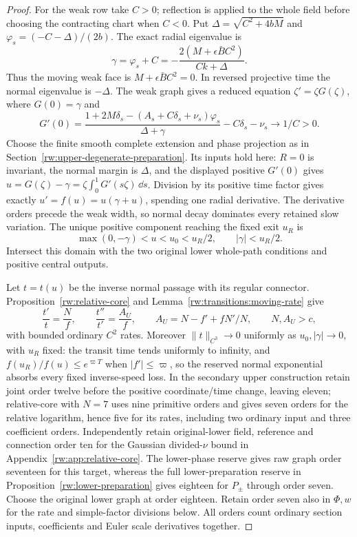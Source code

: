 \begin{proof}
For the weak row take $C>0$; reflection is applied to the whole
field before choosing the contracting chart when $C<0$.
Put $\Delta=\sqrt{C^2+4bM}$ and
$\varphi_s=(-C-\Delta)/(2b)$. The exact radial eigenvalue is
\begin{equation}\label{rw:secondary:weak-face}
 \gamma=\varphi_s+C
 =-\frac{2(M+\epsilon\bar BC^2)}{Ck+\Delta}.
\end{equation}
Thus the moving weak face is $M+\epsilon\bar BC^2=0$.
In reversed projective time the normal eigenvalue is $-\Delta$.
The weak graph gives a reduced equation $\zeta'=\zeta G(\zeta)$,
where $G(0)=\gamma$ and
\[
 G'(0)=
 \frac{1+2M\delta_s-(A_s+C\delta_s+\nu_s)\varphi_s}
      {\Delta+\gamma}-C\delta_s-\nu_s\longrightarrow1/C>0.
\]
Choose the finite smooth complete extension and phase projection as
in Section~\ref{rw:upper-degenerate-preparation}. Its inputs hold here:
$R=0$ is invariant, the normal margin is $\Delta$, and the displayed
positive $G'(0)$ gives
$u=G(\zeta)-\gamma=\zeta\int_0^1G'(s\zeta)\,\dd s$.
Division by its positive time factor gives exactly
$u'=f(u)=u(\gamma+u)$, spending one radial derivative.
The derivative orders precede the weak width, so normal decay
dominates every retained slow variation.
The unique positive component reaching the fixed exit $u_R$ is
\begin{equation}\label{rw:secondary:weak-domain}
 \max(0,-\gamma)<u<u_0<u_R/2,\qquad |\gamma|<u_R/2.
\end{equation}
Intersect this domain with the two original lower whole-path
conditions and positive central outputs.

Let $t=t(u)$ be the inverse normal passage with its regular connector.
Proposition~\ref{rw:relative-core} and
Lemma~\ref{rw:transitions:moving-rate} give
\[
 \frac{t'}t=\frac Nf,\qquad
 \frac{t''}{t'}=\frac{A_U}f,\qquad
 A_U=N-f'+fN'/N,\qquad N,A_U>c,
\]
with bounded ordinary $C^2$ rates. Moreover $\|t\|_{C^3}\to0$
uniformly as $u_0,|\gamma|\to0$, with $u_R$ fixed:
the transit time tends uniformly to infinity, and
$f(u_R)/f(u)\le e^{\varpi T}$ when $|f'|\le\varpi$,
so the reserved normal exponential absorbs every fixed inverse-speed
loss. In the secondary upper construction retain joint order twelve
before the positive coordinate/time change, leaving eleven;
relative-core with $N=7$ uses nine primitive orders and gives seven
orders for the relative logarithm, hence five for its rates, including
two ordinary input and three coefficient orders.
Independently retain original-lower field, reference and connection
order ten for the Gaussian divided-$\nu$ bound in
Appendix~\ref{rw:app:relative-core}. The lower-phase reserve gives
raw graph order seventeen for this target, whereas the full lower-preparation reserve in
Proposition~\ref{rw:lower-preparation} gives eighteen
for $P_\pm$ through order seven. Choose the original lower graph
at order eighteen. Retain order seven also in $\Phi,w$ for the
rate and simple-factor divisions below. All orders count ordinary
section inputs, coefficients and Euler scale derivatives together.


\end{proof}

